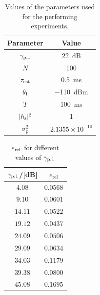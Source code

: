 \begin{table}
	\renewcommand{\arraystretch}{1.4}
	\centering
	\caption{Values of the parameters used for the performing experiments.}
	\label{param}
	\begin{tabular}{c||c}
		\bfseries Parameter & \bfseries Value \\ \hline \hline
		${\gamma}_{\text{p,1}}$ & \SI{22}{dB} \\
		$N$ & 100 \\
		$\tau_{\text{est}}$ & \SI{0.5}{ms}\\
		$\theta_{\text{I}}$ & \SI{-110}{dBm}\\
		$T$ & \SI{100}{ms}\\
		$|h_{\text{s}}|^2$ & 1 \\
		$\sigma^2_{\text{p}}$ & $2.1355\times10^{-10}$\\ \hline
	\end{tabular}
\end{table}

\begin{table}
        \renewcommand{\arraystretch}{1.4}
	\centering
	\caption{$e_{\text{rel}}$ for different values of ${\gamma}_{\text{p,1}}$}
	\label{nichtzentral}
	\begin{tabular}{c||c} 
		\bfseries ${\gamma}_{\text{p,1}}$/[dB] &  \bfseries $e_\textrm{rel}$ \\ \hline \hline
		$4.08$ &  $0.0568$ \\
		$9.10$ &  $0.0601$ \\
		$14.11$ & $0.0522$ \\
		$19.12$ & $0.0437$ \\
		$24.09$ & $0.0506$ \\
		$29.09$ & $0.0634$ \\
		$34.03$ & $0.1179$ \\
		$39.38$ & $0.0800$ \\
		$45.08$ & $0.1695$ \\ \hline
	\end{tabular}
\end{table}


